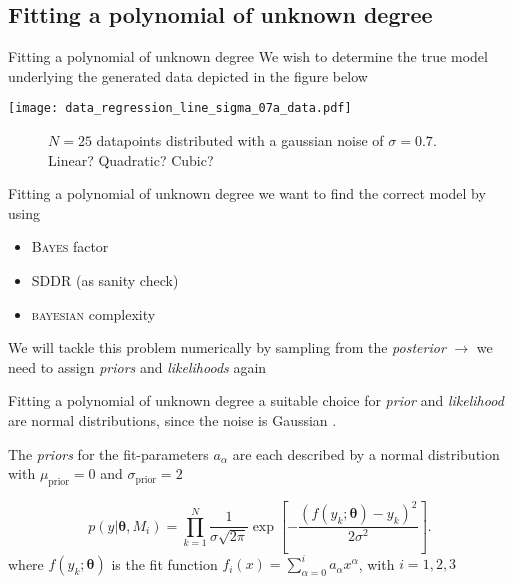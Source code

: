 \documentclass[11pt,aspectratio=1610,dvipsnames]{beamer}
\newcommand{\btheta}{\boldsymbol{\theta}}
\begin{document}
\subsection{Fitting a polynomial of unknown degree}
\begin{frame}{Fitting a polynomial of unknown degree}
	We wish to determine the true model underlying the generated data depicted in the figure below

		\centering
		\begin{minipage}{.7\linewidth}
			\texttt{[image: data\_regression\_line\_sigma\_07a\_data.pdf]}
		\end{minipage}
		\begin{minipage}{.25\linewidth}
				\begin{figure}
						\vspace{4.5cm}
						\caption{$N=25$ datapoints distributed with a gaussian noise of $\sigma=0.7$. Linear? Quadratic? Cubic?}
				\end{figure}

		\end{minipage}

	
	
\end{frame}

\begin{frame}{Fitting a polynomial of unknown degree}
	we want to find the correct model by using
	
	\begin{itemize}
		\item \textsc{Bayes} factor 
		\item SDDR (as sanity check)
		\item \textsc{bayesian} complexity
	\end{itemize}
	We will tackle this problem numerically by sampling from the \emph{posterior} $\to$ we need to assign \emph{priors} and \emph{likelihoods} again
\end{frame}

\begin{frame}{Fitting a polynomial of unknown degree}
	a suitable choice for \emph{prior} and \emph{likelihood} are normal distributions, since the noise is Gaussian \citet{sivia}.
		\begin{tcolorbox}[colback=black!5,colframe=gray!15!black,title=Choosing a prior]
		The \emph{priors} for the fit-parameters $a_\alpha$  are each described by a normal distribution with $\mu_{\text{prior}}=0$ and $\sigma_{\text{prior}}=2$
	\end{tcolorbox}

		\begin{tcolorbox}[colback=black!5,colframe=gray!15!black,title=Choosing a likelihood]
			$$p(y|\btheta, M_i)=\prod_{k=1}^{N}\frac{1}{\sigma\sqrt{2\pi}}\exp{\left[-\frac{(f(y_k;\btheta)-y_k)^2}{2\sigma^2}\right]}.$$
			where $f(y_k;\btheta)$ is the fit function $f_i(x)=\displaystyle\sum_{\alpha=0}^{i}a_\alpha x^\alpha$, with $i=1,2,3$
	\end{tcolorbox}
\end{frame}
\end{document}
